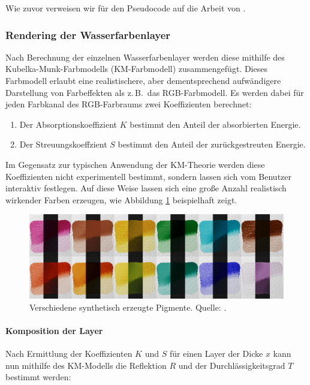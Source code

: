 Wie zuvor verweisen wir für den Pseudocode auf die Arbeit von \cite{Curtis1997}.

\subsubsection{Rendering der Wasserfarbenlayer}
Nach Berechnung der einzelnen Wasserfarbenlayer werden diese mithilfe des 
Kubelka-Munk-Farbmodells (KM-Farbmodell) zusammengefügt. Dieses Farbmodell 
erlaubt eine realistischere, aber dementsprechend aufwändigere Darstellung von 
Farbeffekten als z.\,B.\ das RGB-Farbmodell. Es werden dabei für jeden 
Farbkanal des RGB-Farbraums zwei Koeffizienten berechnet:

\begin{enumerate}
  \item Der Absorptionskoeffizient $K$ bestimmt den Anteil der absorbierten 
  Energie.
  \item Der Streuungskoeffzient $S$ bestimmt den Anteil der zurückgestreuten 
  Energie.
\end{enumerate}

Im Gegensatz zur typischen Anwendung der KM-Theorie werden diese Koeffizienten 
nicht experimentell bestimmt, sondern lassen sich vom Benutzer interaktiv 
festlegen. Auf diese Weise lassen sich eine große Anzahl realistisch wirkender 
Farben erzeugen, wie Abbildung \ref{fig:pigments} beispielhaft zeigt.

\begin{figure}
  \centering
  \includegraphics[width=1.00\textwidth]{../images/Curtis1997-pigments}
  \caption{Verschiedene synthetisch erzeugte Pigmente. Quelle: \cite{Curtis1997}.}
  \label{fig:pigments}
\end{figure}

\paragraph{Komposition der Layer}
Nach Ermittlung der Koeffizienten $K$ und $S$ für einen Layer der Dicke $x$ 
kann nun mithilfe des KM-Modells die Reflektion $R$ und der 
Durchlässigkeitsgrad $T$ bestimmt werden:

